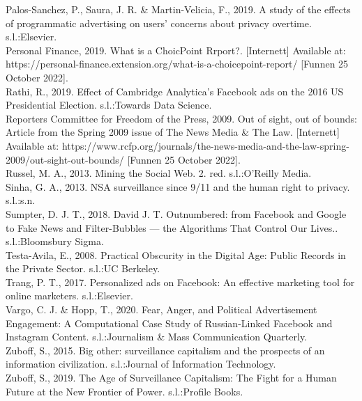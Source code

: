 \documentclass[11pt]{article}
\begin{document}
Palos-Sanchez, P., Saura, J. R. \& Martin-Velicia, F., 2019. A study of the effects of programmatic advertising on users' concerns about privacy overtime. s.l.:Elsevier. \\

Personal Finance, 2019. What is a ChoicPoint Rrport?. [Internett]  
Available at: https://personal-finance.extension.org/what-is-a-choicepoint-report/ 
[Funnen 25 October 2022]. \\

Rathi, R., 2019. Effect of Cambridge Analytica’s Facebook ads on the 2016 US Presidential Election. s.l.:Towards Data Science. \\

Reporters Committee for Freedom of the Press, 2009. Out of sight, out of bounds: Article from the Spring 2009 issue of The News Media \& The Law. [Internett]  
Available at: https://www.rcfp.org/journals/the-news-media-and-the-law-spring-2009/out-sight-out-bounds/ 
[Funnen 25 October 2022]. \\

Russel, M. A., 2013. Mining the Social Web. 2. red. s.l.:O'Reilly Media. \\

Sinha, G. A., 2013. NSA surveillance since 9/11 and the human right to privacy. s.l.:s.n.\\ 

Sumpter, D. J. T., 2018. David J. T. Outnumbered: from Facebook and Google to Fake News and Filter-Bubbles — the Algorithms That Control Our Lives.. s.l.:Bloomsbury Sigma. \\

Testa-Avila, E., 2008. Practical Obscurity in the Digital Age: Public Records in the Private Sector. s.l.:UC Berkeley. \\

Trang, P. T., 2017. Personalized ads on Facebook: An effective marketing tool for online marketers. s.l.:Elsevier. \\

Vargo, C. J. \& Hopp, T., 2020. Fear, Anger, and Political Advertisement Engagement: A Computational Case Study of Russian-Linked Facebook and Instagram Content. s.l.:Journalism \& Mass Communication Quarterly. \\

Zuboff, S., 2015. Big other: surveillance capitalism and the prospects of an information civilization. s.l.:Journal of Information Technology. \\

Zuboff, S., 2019. The Age of Surveillance Capitalism: The Fight for a Human Future at the New Frontier of Power. s.l.:Profile Books. \\
\end{document}
